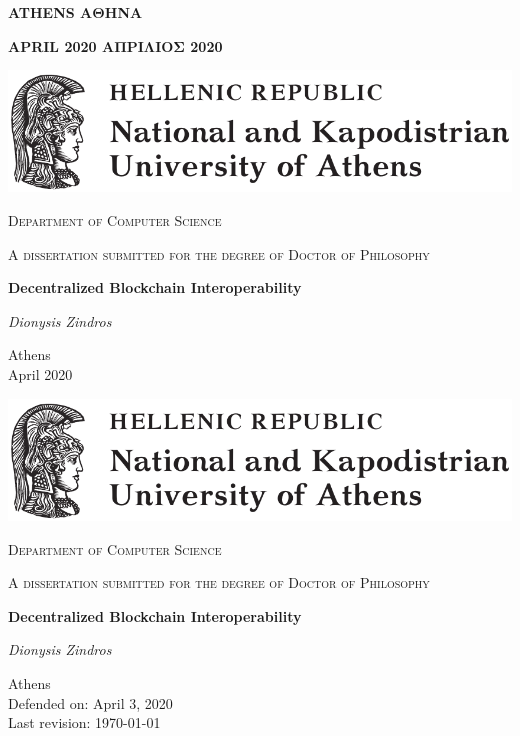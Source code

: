  \vfill
 \begin{center}
 {\bfseries
   \ifenglishfrontpage
   ATHENS
   \else
 ΑΘΗΝΑ
   \fi
 }
 \linebreak

 {\bfseries
   \ifenglishfrontpage
   APRIL 2020
   \else
   ΑΠΡΙΛΙΟΣ 2020
   \fi
   }
 \end{center}
 \clearpage

 \newpage\null\newpage
\else
\def\@primarycover[#1][#2]{
 \begin{titlepage}
  \centering
  \includegraphics[width=\textwidth]{chapters/preface/figures/uoa.pdf}\par\vspace{1cm}
  {\scshape\Large Department of Computer Science\par}
  \vspace{1cm}
  {\scshape A dissertation submitted for the degree of Doctor of Philosophy\par}
  \vspace{1cm}
  {\huge\bfseries Decentralized Blockchain Interoperability\par}
  \vspace{2cm}
  {\Large\itshape Dionysis
                  Zindros\par}
  \vfill
  {\large Athens\\
          \vspace{1cm}
          #1\\
          #2\par
          }
 \end{titlepage}
}
\@primarycover[April 2020][]
\clearpage\null\thispagestyle{empty}
\@primarycover[Defended on: April 3, 2020][Last revision: \today]
\thispagestyle{empty}\newpage
\fi
